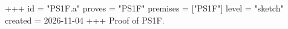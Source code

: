 +++
id = "PS1F.a"
proves = "PS1F"
premises = ["PS1F"]
level = "sketch"
created = 2026-11-04
+++
Proof of PS1F.
